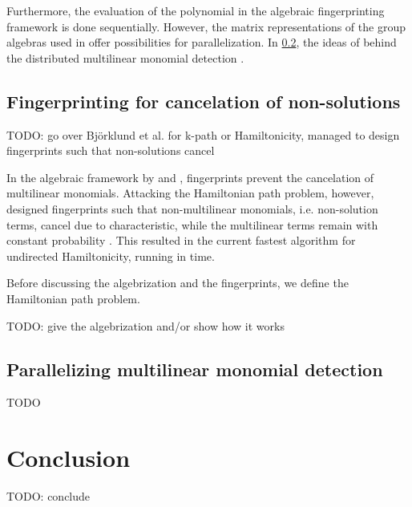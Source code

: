 Furthermore, the evaluation of the polynomial in the algebraic fingerprinting framework is done sequentially. 
However, the matrix representations of the group algebras used in \cite{Williams09} 
offer possibilities for parallelization.
In \cref{sect:parallelization},  the ideas of 
\citeauthor{Midas19} behind the distributed multilinear monomial detection
\cite{Midas19} .

\subsection{Fingerprinting for cancelation of non-solutions}
\label{sect:cancel_nonsolutions}

TODO: go over Björklund et al. for k-path or Hamiltonicity, managed to design fingerprints such that non-solutions cancel

In the algebraic framework by \citeauthor{Koutis08} and \citeauthor{Williams09}, 
fingerprints prevent the cancelation of multilinear monomials. 
Attacking the Hamiltonian path problem, however, \citeauthor{Björklund14} 
designed fingerprints such that non-multilinear monomials, i.e. non-solution terms, 
cancel due to characteristic, while the multilinear terms 
remain with constant probability \cite{Björklund14}. This resulted in the current 
fastest algorithm for undirected Hamiltonicity, running in  time.

Before discussing the algebrization and the fingerprints, 
we define the Hamiltonian path problem.

\begin{problem}
\end{problem}

TODO: give the algebrization and/or show how it works

\subsection{Parallelizing multilinear monomial detection}
\label{sect:parallelization}


TODO

\section{Conclusion}

TODO: conclude